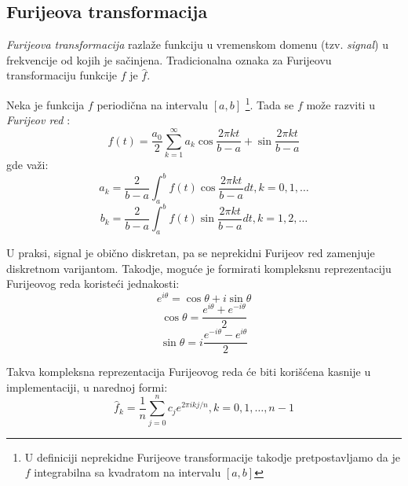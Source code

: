 \subsection{Furijeova transformacija}
\label{sec:Fourier}

\emph{Furijeova transformacija} \cite{Fourier} razla\v{z}e funkciju u vremenskom domenu (tzv. \emph{signal}) u frekvencije od kojih je sa\v{c}injena. Tradicionalna oznaka za Furijeovu transformaciju funkcije $f$ je $\hat{f}$.

Neka je funkcija $f$ periodi\v{c}na na intervalu $[a,b]$ \footnote{U definiciji neprekidne Furijeove transformacije takodje pretpostavljamo da je $f$ integrabilna sa kvadratom na intervalu $[a,b]$}. Tada se $f$ mo\v{z}e razviti u \emph{Furijeov red} \cite{NI}:
$$f(t) = \frac{a_0}{2} \sum_{k=1}^{\infty}{a_k \cos{\frac{2\pi kt}{b-a}} + \sin{\frac{2\pi kt}{b-a}}}$$
gde va\v{z}i:
$$a_k = \frac{2}{b-a}\int_{a}^{b}{f(t)\cos{\frac{2\pi kt}{b-a}}dt}   , k = 0, 1, \dots$$
$$b_k = \frac{2}{b-a}\int_{a}^{b}{f(t)\sin{\frac{2\pi kt}{b-a}}dt}   , k = 1, 2, \dots$$

U praksi, signal je obi\v{c}no diskretan, pa se neprekidni Furijeov red zamenjuje diskretnom varijantom. Takodje, mogu\'c{}e je formirati kompleksnu reprezentaciju Furijeovog reda koriste\'c{}i jednakosti:
$$e^{i\theta} = \cos{\theta} + i\sin{\theta}$$
$$\cos{\theta} = \frac{e^{i\theta} + e^{-i\theta}}{2}$$
$$\sin{\theta} = i\frac{e^{-i\theta} - e^{i\theta}}{2}$$

Takva kompleksna reprezentacija Furijeovog reda \'c{}e biti kori\v{s}\'c{}ena kasnije u implementaciji, u narednoj formi:
$$\hat{f}_k = \frac{1}{n}\sum_{j=0}^{n}{c_je^{2\pi ikj/n}}, k = 0, 1, \dots, n-1$$